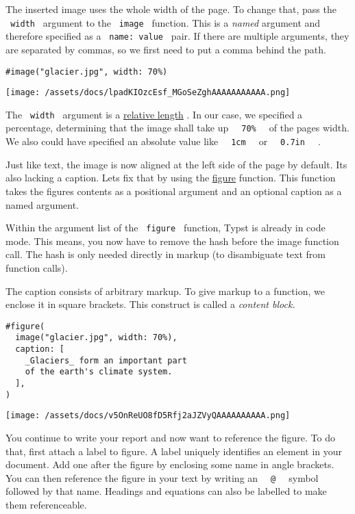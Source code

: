 The inserted image uses the whole width of the page. To change that,
pass the \texttt{\ width\ } argument to the \texttt{\ image\ } function.
This is a \emph{named} argument and therefore specified as a
\texttt{\ name:\ value\ } pair. If there are multiple arguments, they
are separated by commas, so we first need to put a comma behind the
path.

\begin{verbatim}
#image("glacier.jpg", width: 70%)
\end{verbatim}

\texttt{[image: /assets/docs/lpadKIOzcEsf\_MGoSeZghAAAAAAAAAAA.png]}

The \texttt{\ width\ } argument is a
\href{/docs/reference/layout/relative/}{relative length} . In our case,
we specified a percentage, determining that the image shall take up
\texttt{\ }{\texttt{\ 70\%\ }}\texttt{\ } of the page\textquotesingle s
width. We also could have specified an absolute value like
\texttt{\ }{\texttt{\ 1cm\ }}\texttt{\ } or
\texttt{\ }{\texttt{\ 0.7in\ }}\texttt{\ } .

Just like text, the image is now aligned at the left side of the page by
default. It\textquotesingle s also lacking a caption.
Let\textquotesingle s fix that by using the
\href{/docs/reference/model/figure/}{figure} function. This function
takes the figure\textquotesingle s contents as a positional argument and
an optional caption as a named argument.

Within the argument list of the \texttt{\ figure\ } function, Typst is
already in code mode. This means, you now have to remove the hash before
the image function call. The hash is only needed directly in markup (to
disambiguate text from function calls).

The caption consists of arbitrary markup. To give markup to a function,
we enclose it in square brackets. This construct is called a
\emph{content block.}

\begin{verbatim}
#figure(
  image("glacier.jpg", width: 70%),
  caption: [
    _Glaciers_ form an important part
    of the earth's climate system.
  ],
)
\end{verbatim}

\texttt{[image: /assets/docs/v5OnReUO8fD5Rfj2aJZVyQAAAAAAAAAA.png]}

You continue to write your report and now want to reference the figure.
To do that, first attach a label to figure. A label uniquely identifies
an element in your document. Add one after the figure by enclosing some
name in angle brackets. You can then reference the figure in your text
by writing an \texttt{\ }{\texttt{\ @\ }}\texttt{\ } symbol followed by
that name. Headings and equations can also be labelled to make them
referenceable.

